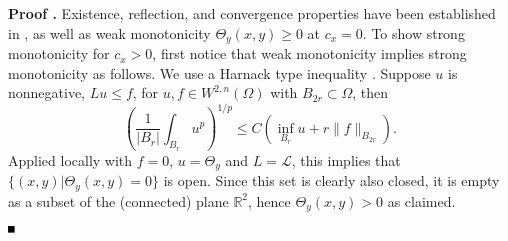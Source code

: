 \documentclass[10pt]{article}
\newenvironment{Proof}[1][\unskip]%
 {\begin{trivlist} \item[]{\bf Proof #1. }}%
 {\hspace*{\fill}$\rule{.4\baselineskip}{.4\baselineskip}$\end{trivlist}}
\newcommand{\R}{\mathbb{R}}
\renewcommand{\leq}{\leqslant}
\renewcommand{\geq}{\geqslant}
\begin{document}
\begin{Proof}
Existence, reflection, and convergence properties have been established in \cite{Monteiro_Scheel}, as well as weak monotonicity $\Theta_y(x,y)\geq0$ at $c_x=0$. To show strong monotonicity for $c_x>0$, first notice that weak monotonicity implies strong monotonicity as follows.  We use a  Harnack type inequality \cite[Thm. 9.22]{gilbarg2015elliptic}. Suppose $u$ is nonnegative, $Lu \leq f $, for $u, f \in W^{2,n}(\Omega)$ with  $B_{2r} \subset \Omega$, then
\begin{equation*}
\left(\frac{1}{|B_r|}\int_{B_r}u^p\right)^{1/p} \leq C \left(\inf_{B_r}u +r \| f\|_{B_{2r}}\right) .
\end{equation*} 
Applied  locally with $f=0$, $u=\Theta_y$ and $L = \mathscr{L}$, this implies that  $\{(x,y)|\Theta_y(x,y) =0\}$ is open. Since this set is clearly also closed, it is empty as a subset of the (connected) plane $\R^2$, hence $\Theta_y(x,y)>0$ as claimed.


\end{Proof}
\end{document}
